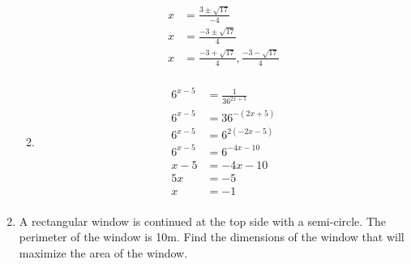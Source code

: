 \documentclass[paper=a4, fontsize=11pt]{scrartcl}
\begin{document}
\begin{enumerate}
\begin{enumerate}
\begin{align*}
            x&=\frac{3\pm\sqrt{17}}{-4}\\
            x&=\frac{-3\pm\sqrt{17}}{4}\\
            x&=\frac{-3+\sqrt{17}}{4},\frac{-3-\sqrt{17}}{4}\\
        \end{align*}
        \item \begin{align*}
            6^{x-5}&=\frac{1}{36^{2x+5}}\\
            6^{x-5}&=36^{-(2x+5)}\\
            6^{x-5}&=6^{2(-2x-5)}\\
            6^{x-5}&=6^{-4x-10}\\
            x-5&=-4x-10\\
            5x&=-5\\
            x&=-1\\
        \end{align*}
    \end{enumerate}
    \item A rectangular window is continued at the top side with a semi-circle. The perimeter of the window is 10m. Find the dimensions of the window that will maximize the area of the window.
\end{enumerate}
\end{document}
